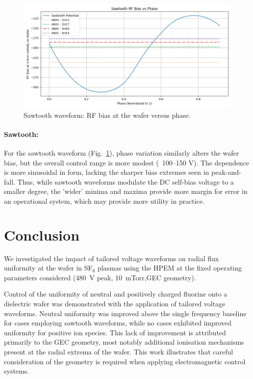 \documentclass[12pt]{article}
\begin{document}
\begin{figure}[H]
  \centering
  \includegraphics[width=\linewidth]{Figures/Sawtooth.png}
  \caption{Sawtooth waveform: RF bias at the wafer versus phase.}
  \label{fig:st_bias}
\end{figure}

\paragraph{Sawtooth:}
For the sawtooth waveform (Fig.~\ref{fig:st_bias}), phase variation similarly alters the wafer bias, but the overall control range is more modest (~100–150 V). The dependence is more sinusoidal in form, lacking the sharper bias extremes seen in peak-and-fall. Thus, while sawtooth waveforms modulate the DC self-bias voltage to a smaller degree, the 'wider' minima and maxima provide more margin for error in an operational system, which may provide more utility in practice.

\section{Conclusion}
\label{sec:conclusion}

We investigated the impact of tailored voltage waveforms on radial flux uniformity at the wafer in SF$_6$ plasmas using the HPEM at the fixed operating parameters considered (480~V peak, 10~mTorr,GEC geometry).

Control of the uniformity of neutral and positively charged fluorine onto a dielectric wafer was demonstrated with the application of tailored voltage waveforms. Neutral uniformity was improved above the single frequency baseline for cases employing sawtooth waveforms, while no cases exhibited improved uniformity for positive ion species. This lack of improvement is attributed primarily to the GEC geometry, most notably additional ionisation mechanisms present at the radial extrema of the wafer. This work illustrates that careful consideration of the geometry is required when applying electromagnetic control systems.
\end{document}
